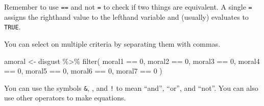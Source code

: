 \documentclass[
  oneside]{book}
\newenvironment{Shaded}{\begin{snugshade}}{\end{snugshade}}
\newcommand{\DecValTok}[1]{\textcolor[rgb]{0.00,0.00,0.81}{#1}}
\newcommand{\FunctionTok}[1]{\textcolor[rgb]{0.00,0.00,0.00}{#1}}
\newcommand{\NormalTok}[1]{#1}
\newcommand{\OtherTok}[1]{\textcolor[rgb]{0.56,0.35,0.01}{#1}}
\newcommand{\SpecialCharTok}[1]{\textcolor[rgb]{0.00,0.00,0.00}{#1}}
\begin{document}
\begin{warning}
Remember to use \texttt{==} and not \texttt{=} to check if two things are equivalent. A single \texttt{=} assigns the righthand value to the lefthand variable and (usually) evaluates to \texttt{TRUE}.

\end{warning}

You can select on multiple criteria by separating them with commas.

\begin{Shaded}
\begin{Highlighting}[]
\NormalTok{amoral }\OtherTok{\textless{}{-}}\NormalTok{ disgust }\SpecialCharTok{\%\textgreater{}\%} \FunctionTok{filter}\NormalTok{(}
\NormalTok{  moral1 }\SpecialCharTok{==} \DecValTok{0}\NormalTok{, }
\NormalTok{  moral2 }\SpecialCharTok{==} \DecValTok{0}\NormalTok{,}
\NormalTok{  moral3 }\SpecialCharTok{==} \DecValTok{0}\NormalTok{, }
\NormalTok{  moral4 }\SpecialCharTok{==} \DecValTok{0}\NormalTok{,}
\NormalTok{  moral5 }\SpecialCharTok{==} \DecValTok{0}\NormalTok{,}
\NormalTok{  moral6 }\SpecialCharTok{==} \DecValTok{0}\NormalTok{,}
\NormalTok{  moral7 }\SpecialCharTok{==} \DecValTok{0}
\NormalTok{)}
\end{Highlighting}
\end{Shaded}

You can use the symbols \texttt{\&}, \texttt{\textbar{}}, and \texttt{!} to mean ``and'', ``or'', and ``not''. You can also use other operators to make equations.
\end{document}

